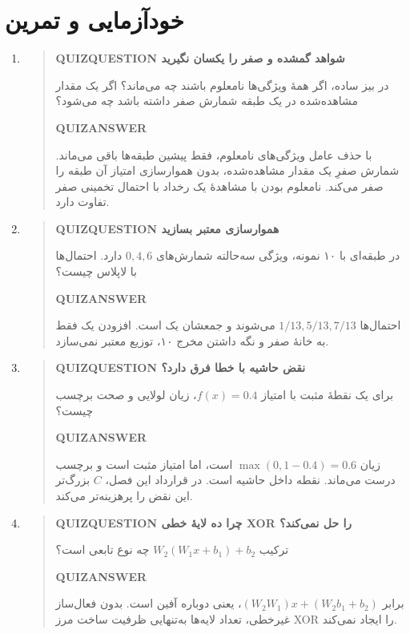 \section{خودآزمایی و تمرین}
\begin{enumerate}
\item\begin{quote}\textbf{QUIZQUESTION شواهد گمشده و صفر را یکسان نگیرید}\par 
در بیز ساده، اگر همهٔ ویژگی‌ها نامعلوم باشند چه می‌ماند؟ اگر یک مقدار مشاهده‌شده در یک طبقه شمارش صفر داشته باشد چه می‌شود؟
\par\textbf{QUIZANSWER}\par با حذف عامل ویژگی‌های نامعلوم، فقط پیشین طبقه‌ها باقی می‌ماند. شمارش صفرِ یک مقدار مشاهده‌شده، بدون هموارسازی امتیاز آن طبقه را صفر می‌کند. نامعلوم بودن با مشاهدهٔ یک رخداد با احتمال تخمینی صفر تفاوت دارد.\par 
\end{quote}
\item\begin{quote}\textbf{QUIZQUESTION هموارسازی معتبر بسازید}\par 
در طبقه‌ای با ۱۰ نمونه، ویژگی سه‌حالته شمارش‌های $0,4,6$ دارد. احتمال‌ها با لاپلاس چیست؟
\par\textbf{QUIZANSWER}\par احتمال‌ها $1/13,5/13,7/13$ می‌شوند و جمعشان یک است. افزودن یک فقط به خانهٔ صفر و نگه داشتن مخرج ۱۰، توزیع معتبر نمی‌سازد.\par 
\end{quote}
\item\begin{quote}\textbf{QUIZQUESTION نقض حاشیه با خطا فرق دارد؟}\par 
برای یک نقطهٔ مثبت با امتیاز $f(x)=0.4$، زیان لولایی و صحت برچسب چیست؟
\par\textbf{QUIZANSWER}\par زیان $\max(0,1-0.4)=0.6$ است، اما امتیاز مثبت است و برچسب درست می‌ماند. نقطه داخل حاشیه است. در قرارداد این فصل، $C$ بزرگ‌تر این نقض را پرهزینه‌تر می‌کند.\par 
\end{quote}
\item\begin{quote}\textbf{QUIZQUESTION چرا ده لایهٔ خطی XOR را حل نمی‌کند؟}\par 
ترکیب $W_2(W_1x+b_1)+b_2$ چه نوع تابعی است؟
\par\textbf{QUIZANSWER}\par برابر $(W_2W_1)x+(W_2b_1+b_2)$، یعنی دوباره آفین است. بدون فعال‌ساز غیرخطی، تعداد لایه‌ها به‌تنهایی ظرفیت ساخت مرز XOR را ایجاد نمی‌کند.\par 

\end{quote}
\end{enumerate}
